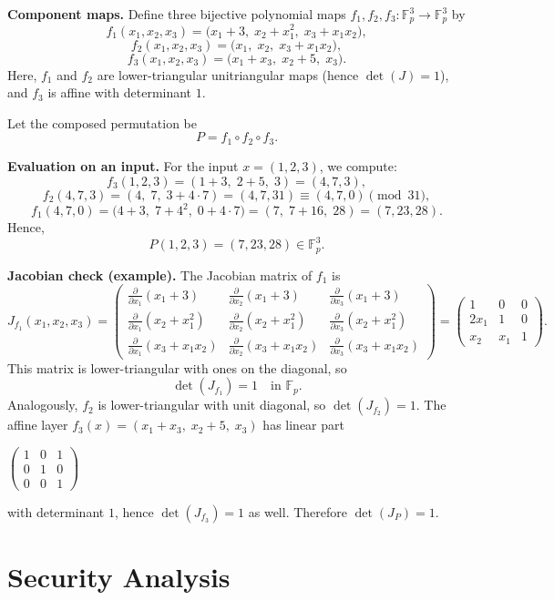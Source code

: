 ﻿\documentclass[english]{aucmcs}
\newcommand{\Fp}{\mathbb{F}_p}
\begin{document}
\textbf{Component maps.} Define three bijective polynomial maps
$f_1,f_2,f_3:\Fp^3\to\Fp^3$ by
\[
f_1(x_1,x_2,x_3)=\bigl(x_1+3,\; x_2+x_1^2,\; x_3+x_1x_2\bigr),
\]
\[
f_2(x_1,x_2,x_3)=\bigl(x_1,\; x_2,\; x_3+x_1x_2\bigr),
\]
\[
f_3(x_1,x_2,x_3)=\bigl(x_1+x_3,\; x_2+5,\; x_3\bigr).
\]
Here, $f_1$ and $f_2$ are lower-triangular unitriangular maps (hence $\det(J)=1$),
and $f_3$ is affine with determinant $1$.

Let the composed permutation be
\[
P=f_1\circ f_2\circ f_3.
\]

\textbf{Evaluation on an input.} For the input $x=(1,2,3)$, we compute:
\[
f_3(1,2,3)=(1+3,\;2+5,\;3)=(4,7,3),
\]
\[
f_2(4,7,3)=(4,\;7,\;3+4\cdot 7)=(4,7,31)\equiv(4,7,0)\pmod{31},
\]
\[
f_1(4,7,0)=\bigl(4+3,\;7+4^2,\;0+4\cdot 7\bigr)=(7,\;7+16,\;28)=(7,23,28).
\]
Hence,
\[
P(1,2,3)=(7,23,28)\in \Fp^3.
\]

\textbf{Jacobian check (example).} The Jacobian matrix of $f_1$ is
\[
J_{f_1}(x_1,x_2,x_3)=
\begin{pmatrix}
\frac{\partial}{\partial x_1}(x_1+3) & \frac{\partial}{\partial x_2}(x_1+3) & \frac{\partial}{\partial x_3}(x_1+3) \\
\frac{\partial}{\partial x_1}(x_2+x_1^2) & \frac{\partial}{\partial x_2}(x_2+x_1^2) & \frac{\partial}{\partial x_3}(x_2+x_1^2) \\
\frac{\partial}{\partial x_1}(x_3+x_1x_2) & \frac{\partial}{\partial x_2}(x_3+x_1x_2) & \frac{\partial}{\partial x_3}(x_3+x_1x_2)
\end{pmatrix}
=
\begin{pmatrix}
1 & 0 & 0 \\
2x_1 & 1 & 0 \\
x_2 & x_1 & 1
\end{pmatrix}.
\]
This matrix is lower-triangular with ones on the diagonal, so
\[
\det(J_{f_1})=1 \quad \text{in } \Fp.
\]
Analogously, $f_2$ is lower-triangular with unit diagonal, so $\det(J_{f_2})=1$.
The affine layer $f_3(x)=(x_1+x_3,\;x_2+5,\;x_3)$ has linear part

$\left(\begin{smallmatrix}
1 & 0 & 1\\
0 & 1 & 0\\
0 & 0 & 1
\end{smallmatrix}\right)$

with determinant $1$,
hence $\det(J_{f_3})=1$ as well. Therefore $\det(J_P)=1$.



\section{Security Analysis}
\label{sec:security}
\end{document}
